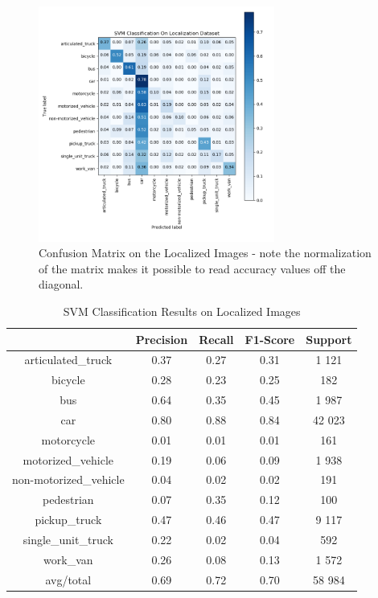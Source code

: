 \documentclass[12pt]{article}
\begin{document}
\begin{figure}[H]
  \hfill\includegraphics[width=0.69\textwidth]{clf_svm_loc.png}\hspace*{\fill}
  \caption{Confusion Matrix on the Localized Images - note the normalization of the matrix makes it possible to read accuracy values off the diagonal.}
\end{figure}

\begin{table}[H] 
    \centering
        \begin{tabular}{ | c | c | c | c | c |}
        \hline
                                   & Precision & Recall & F1-Score & Support \\
                                   \hline
            articulated\_truck     & 0.37      & 0.27   & 0.31     & 1 121    \\
            bicycle                & 0.28      & 0.23   & 0.25     & 182     \\
            bus                    & 0.64      & 0.35   & 0.45     & 1 987   \\
            car                    & 0.80      & 0.88   & 0.84     & 42 023   \\
            motorcycle             & 0.01      & 0.01   & 0.01     & 161     \\
            motorized\_vehicle     & 0.19      & 0.06   & 0.09     & 1 938    \\
            non-motorized\_vehicle & 0.04      & 0.02   & 0.02     & 191     \\
            pedestrian             & 0.07      & 0.35   & 0.12     & 100     \\
            pickup\_truck          & 0.47      & 0.46   & 0.47     & 9 117    \\
            single\_unit\_truck    & 0.22      & 0.02   & 0.04     & 592     \\
            work\_van              & 0.26      & 0.08   & 0.13     & 1 572    \\
            \hline
            avg/total              & 0.69      & 0.72   & 0.70     & 58 984   \\
            \hline
        \end{tabular}
    \caption{SVM Classification Results on Localized Images}
    \label{table:clf_results}
    \end{table}
\end{document}
